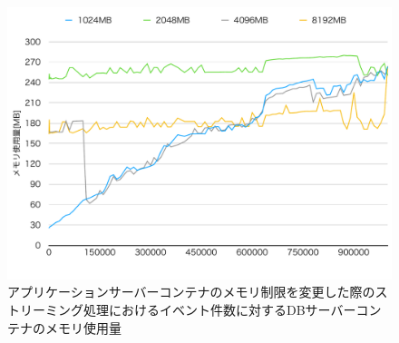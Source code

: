 \documentclass[../../../../../main]{subfiles}
\begin{document}
    \begin{figure}[H]
        \centering
        \includegraphics[width=12cm]{graph}
        \caption{アプリケーションサーバーコンテナのメモリ制限を変更した際のストリーミング処理におけるイベント件数に対するDBサーバーコンテナのメモリ使用量}
        \label{fig:stream-change-app-memory-limit-db-memory-app_4_db_1_1024}
    \end{figure}
\end{document}
